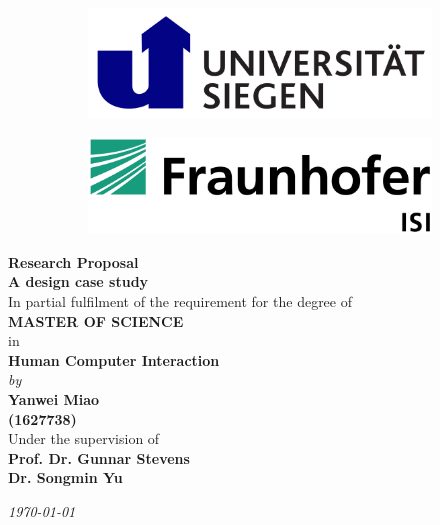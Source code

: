 \begin{titlepage}

\begin{center}

\vspace*{-1cm}

\begin{figure}[h]
  \begin{subfigure}{0.5\textwidth}
    \includegraphics[width=0.8\linewidth, left]{Images/siegen.png}
  \end{subfigure}
  \begin{subfigure}{0.5\textwidth}
    \includegraphics[width=0.8\linewidth, right]{Images/isi.jpeg}
  \end{subfigure}
\end{figure}

\vfill

\textbf{\large Research Proposal}\\[10pt]
{\Large \bf A design case study}\\

\vfill
In partial fulfilment of the requirement for the degree of\\
{\large \bf MASTER OF SCIENCE}\\
in\\ 
{\large \bf Human Computer Interaction } \\
{\em  by} \\
{\large \bf Yanwei Miao} \\
{\large \bf (1627738)}\\

Under the supervision of \\
{\bf\large Prof. Dr. Gunnar Stevens} \\
{\bf\large Dr. Songmin Yu} \\

\vfill

{\it\large \today}

\end{center}

\end{titlepage}

\clearpage